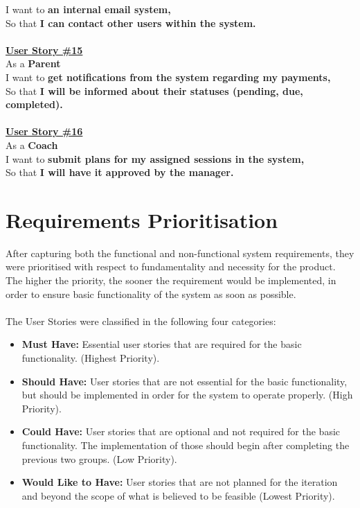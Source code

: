 \documentclass{l3proj}
\begin{document}
I want to \textbf{an internal email system,}\\
So that \textbf{I can contact other users within the system.}\\
\\
\textbf{\underline{User Story \#15}}\\
As a \textbf{Parent}\\
I want to \textbf{get notifications from the system regarding my payments,}\\
So that \textbf{I will be informed about their statuses (pending, due, completed).}\\
\\
\textbf{\underline{User Story \#16}}\\
As a \textbf{Coach}\\
I want to \textbf{submit plans for my assigned sessions in the system,}\\
So that \textbf{I will have it approved by the manager.}\\

\section{Requirements Prioritisation}
\par After capturing both the functional and non-functional system requirements,  they were prioritised with respect to fundamentality and necessity for the product. The higher the priority, the sooner the requirement would be implemented, in order to ensure basic functionality of the system as soon as possible.\\
\\
The User Stories were classified in the following four categories:
\begin{itemize}
	\item \textbf{Must Have:} Essential user stories that are required for the basic functionality. (Highest Priority).
	\item \textbf{Should Have:} User stories that are not essential for the basic functionality, but should be implemented in order for the system to operate properly. (High Priority).
	\item \textbf{Could Have:} User stories that are optional and not required for the basic functionality. The implementation of those should begin after completing the previous two groups. (Low Priority).
	\item \textbf{Would Like to Have:} User stories that are not planned for the iteration and beyond the scope of what is believed to be feasible (Lowest Priority).
\end{itemize}
\end{document}
